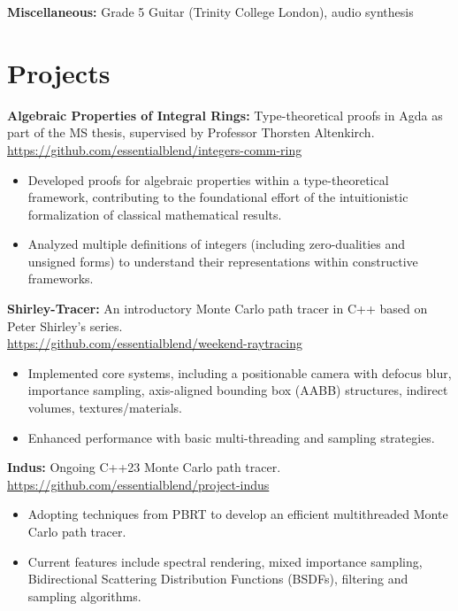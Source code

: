 \documentclass[11pt,a4paper]{article}
\begin{document}
\noindent \textbf{Miscellaneous:} Grade 5 Guitar (Trinity College London), audio synthesis

\section{Projects}
\vspace{1pt}

\noindent \textbf{Algebraic Properties of Integral Rings:} Type-theoretical proofs in Agda as part of the MS thesis, supervised by Professor Thorsten Altenkirch.\\
\url{https://github.com/essentialblend/integers-comm-ring}
\begin{itemize}
    \item Developed proofs for algebraic properties within a type-theoretical framework, contributing to the foundational effort of the intuitionistic formalization of classical mathematical results.
    \item Analyzed multiple definitions of integers (including zero-dualities and unsigned forms) to understand their representations within constructive frameworks.
\end{itemize}
\vspace{8pt}

\noindent \textbf{Shirley-Tracer:} An introductory Monte Carlo path tracer in C++ based on Peter Shirley's series.\\
\url{https://github.com/essentialblend/weekend-raytracing}
\begin{itemize}
    \item Implemented core systems, including a positionable camera with defocus blur, importance sampling, axis-aligned bounding box (AABB) structures, indirect volumes, textures/materials.
    \item Enhanced performance with basic multi-threading and sampling strategies.
\end{itemize}
\vspace{8pt}

\noindent \textbf{Indus:} Ongoing C++23 Monte Carlo path tracer.\\
\url{https://github.com/essentialblend/project-indus}
\begin{itemize}
    \item Adopting techniques from PBRT to develop an efficient multithreaded Monte Carlo path tracer.
    \item Current features include spectral rendering, mixed importance sampling,  Bidirectional Scattering Distribution Functions (BSDFs), filtering and sampling algorithms.
\end{itemize}
\end{document}
